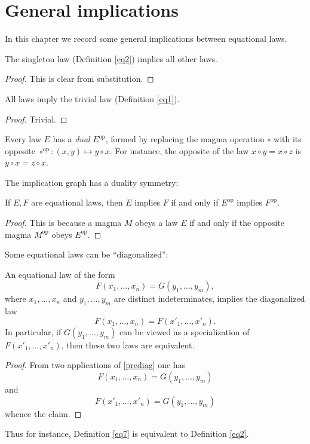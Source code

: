 \chapter{General implications}

In this chapter we record some general implications between equational laws.

\begin{theorem}\label{singleton-all}  The singleton law (Definition \ref{eq2}) implies all other laws.
\end{theorem}

\begin{proof} This is clear from substitution.
\end{proof}

\begin{theorem}\label{all-trivial}  All laws imply the trivial law (Definition \ref{eq1}).
\end{theorem}

\begin{proof} Trivial.
\end{proof}

Every law $E$ has a \emph{dual} $E^{\mathrm{op}}$, formed by replacing the magma operation $\circ$ with its opposite $\circ^{\mathrm{op}}:(x,y) \mapsto y \circ x$.  For instance, the opposite of the law $x \circ y = x \circ z$ is $y \circ x = z \circ x$.

The implication graph has a duality symmetry:

\begin{theorem}[Duality]\label{duality}  If $E,F$ are equational laws, then $E$ implies $F$ if and only if $E^{\mathrm{op}}$ implies $F^{\mathrm{op}}$.
\end{theorem}

\begin{proof} This is because a magma $M$ obeys a law $E$ if and only if the opposite magma $M^{\mathrm{op}}$ obeys $E^{\mathrm{op}}$.
\end{proof}

Some equational laws can be ``diagonalized'':

\begin{theorem}[Diagonalization]\label{diag}  An equational law of the form
  \begin{equation}\label{prediag} F(x_1,\dots,x_n) = G(y_1,\dots,y_m),
  \end{equation}
  where $x_1,\dots,x_n$ and $y_1,\dots,y_m$ are distinct indeterminates, implies the diagonalized law
$$ F(x_1,\dots,x_n) = F(x'_1,\dots,x'_n).$$
In particular, if $G(y_1,\dots,y_m)$ can be viewed as a specialization of $F(x'_1,\dots,x'_n)$, then these two laws are equivalent.
\end{theorem}

\begin{proof}  From two applications of \eqref{prediag} one has
$$ F(x_1,\dots,x_n) = G(y_1,\dots,y_m)$$
and
$$ F(x'_1,\dots,x'_n) = G(y_1,\dots,y_m)$$
whence the claim.
\end{proof}

Thus for instance, Definition \ref{eq7} is equivalent to Definition \ref{eq2}.


